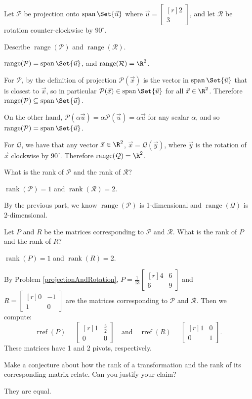 \documentclass{problemset}
\DeclareMathOperator{\Span}{span}
\DeclareMathOperator{\Range}{range}
\DeclareMathOperator{\Rref}{rref}
\DeclareMathOperator{\Rank}{rank}
\newcommand{\rref}{\Rref}
\newcommand{\mat}[1]{\begin{bmatrix*}[r]#1\end{bmatrix*}}
\begin{document}
	\question
	\label{rankOfMatricesAndTransformations}
	Let $\mathcal P$ be projection onto $\Span\Set{\vec u}$ where $\vec u=\mat{2\\3}$,
	and let $\mathcal R$ be rotation counter-clockwise by $90^\circ$.
	\begin{parts}
		\item Describe $\Range(\mathcal P)$ and $\Range(\mathcal R)$.
			\begin{solution}
				$\Range(\mathcal P)=\Span\Set{\vec u}$, and $\Range(\mathcal R)=\R^2$.

				For $\mathcal P$, by the definition of projection $\mathcal P(\vec x)$
				is the vector in $\Span\Set{\vec u}$ that is closest to $\vec x$,
				so in particular $\mathcal P(\vec x) \in \Span\Set{\vec u}$ for
				all $\vec x\in\R^2$. Therefore $\Range(\mathcal P)\subseteq\Span\Set{\vec u}$.

				On the other hand, $\mathcal P(\alpha \vec u)=\alpha\mathcal P(\vec u)=\alpha\vec u$ 
				for any scalar $\alpha$, and so $\Range(\mathcal P)=\Span\Set{\vec u}$.

				For $\mathcal Q$, we have that any vector $\vec x\in\R^2$, 
				$\vec x=\mathcal Q(\vec y)$, where $\vec y$ is the rotation of 
				$\vec x$ clockwise by $90^\circ$. Therefore $\Range(\mathcal Q)=\R^2$. 
			\end{solution}
		\item What is the rank of $\mathcal P$ and the rank of $\mathcal R$?
			\begin{solution}
				$\Rank(\mathcal P)=1$ and $\Rank(\mathcal R)=2$.

				By the previous part, we know $\Range(\mathcal P)$ is 1-dimensional
				and $\Range(\mathcal Q)$ is 2-dimensional. 
			\end{solution}
		\item Let $P$ and $R$ be the matrices corresponding to $\mathcal P$ and
			$\mathcal R$. What is the rank of $P$ and the rank of $R$?
			\begin{solution}
				$\Rank(P)=1$ and $\Rank(R)=2$.

				By Problem \ref{projectionAndRotation}, $P=\frac{1}{13}\mat{4&6\\6&9}$
				and $R=\mat{0&-1\\1&0}$ are the	matrices corresponding to 
				$\mathcal P$ and $\mathcal R$. Then we compute:
				\[
					\rref(P)=\mat{1&\frac{3}{2}\\0&0}
					\quad \text{and} \quad
					\rref(R)=\mat{1&0\\0&1}.
				\]
				These matrices have 1 and 2 pivots, respectively. 
			\end{solution}
		\item Make a conjecture about how the rank of a transformation and the
			rank of its corresponding matrix relate. Can you justify your claim?
			\label{rankOfMatricesAndTransformations.4}
			\begin{solution}
				They are equal. 


\end{solution}
\end{parts}
\end{document}
